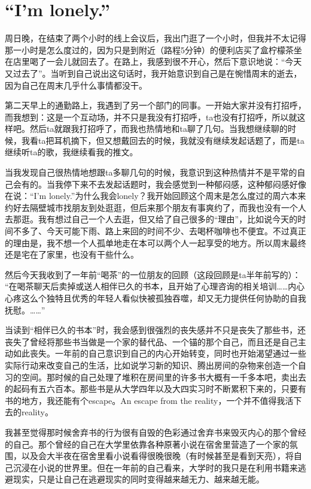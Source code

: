 \chapter{“I'm lonely.”}



周日晚，在结束了两个小时的线上会议后，我出门逛了一个小时，但我并不太记得那一小时是怎么度过的，因为只是到附近（路程5分钟）的便利店买了盒柠檬茶坐在店里喝了一会儿就回去了。在路上，我感到很不开心，然后下意识地说：“今天又过去了”。当听到自己说出这句话时，我开始意识到自己是在惋惜周末的逝去，因为自己在周末几乎什么事情都没干。

第二天早上的通勤路上，我遇到了另一个部门的同事。一开始大家并没有打招呼，而我想到：这是一个互动场，并不只是我没有打招呼，ta也没有打招呼，所以就这样吧。然后ta就跟我打招呼了，而我也热情地和ta聊了几句。当我想继续聊的时候，我看ta把耳机摘下，但又想戴回去的时候，我就没有继续发起话题了，而是ta继续听ta的歌，我继续看我的推文。

当我发现自己很热情地想跟ta多聊几句的时候，我意识到这种热情并不是平常的自己会有的。当我停下来不去发起话题时，我会感觉到一种郁闷感，这种郁闷感好像在说：“I'm lonely.”为什么我会lonely？我开始回顾这个周末是怎么度过的\pozhehao{}周六本来约好去隔壁城市找朋友到处逛逛，但后来那个朋友有事爽约了，而我也没有一个人去那逛。我有想过自己一个人去逛，但又给了自己很多的“理由”，比如说今天的时间不多了、今天可能下雨、路上来回的时间不少、去喝杯咖啡也不便宜。不过真正的理由是，我不想一个人孤单地走在本可以两个人一起享受的地方。所以周末最终还是宅在了家里，也没有干些什么。

然后今天我收到了一年前“喝茶”的一位朋友的回顾（这段回顾是ta半年前写的）：
“在喝茶聊天后卖掉或送人相伴已久的书本，且开始了心理咨询的相关培训……内心心疼这么个独特且优秀的年轻人看似快被孤独吞噬，却又无力提供任何协助的自我抚慰。……”

当读到“相伴已久的书本”时，我会感到很强烈的丧失感\pozhehao{}并不只是丧失了那些书，还丧失了曾经将那些书当做是一个家的替代品、一个锚的那个自己，而且还是自己主动如此丧失。一年前的自己意识到自己的内心开始转变，同时也开始渴望通过一些实际行动来改变自己的生活，比如说学习新的知识、腾出房间的杂物来创造一个自习的空间。那时候的自己处理了堆积在房间里的许多书\pozhehao{}大概有一千多本吧，卖出去的起码有五六百本。那些书是从大学四年以及大四实习时不断累积下来的，只要有书的地方，我还能有个escape。An escape from the reality，一个并不值得我活下去的reality。

我甚至觉得那时候舍弃书的行为很有自毁的色彩\pozhehao{}通过舍弃书来毁灭内心的那个曾经的自己。那个曾经的自己在大学里依靠各种原著小说在宿舍里营造了一个家的氛围，以及会大半夜在宿舍里看小说看得很晚很晚（有时候甚至是看到天亮），将自己沉浸在小说的世界里。但在一年前的自己看来，大学时的我只是在利用书籍来逃避现实，只是让自己在逃避现实的同时变得越来越无力、越来越无能。

